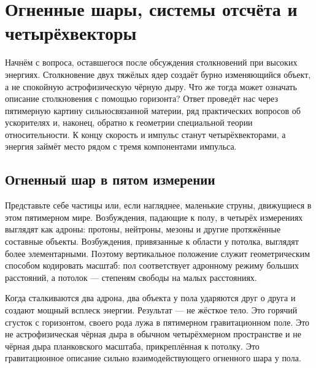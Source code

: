\chapter{Огненные шары, системы отсчёта и четырёхвекторы}

Начнём с вопроса, оставшегося после обсуждения столкновений при высоких энергиях. Столкновение двух тяжёлых ядер создаёт бурно изменяющийся объект, а не спокойную астрофизическую чёрную дыру. Что же тогда может означать описание столкновения с помощью горизонта? Ответ проведёт нас через пятимерную картину сильносвязанной материи, ряд практических вопросов об ускорителях и, наконец, обратно к геометрии специальной теории относительности. К концу скорость и импульс станут четырёхвекторами, а энергия займёт место рядом с тремя компонентами импульса.

\section{Огненный шар в пятом измерении}

\begin{classroomqa}
\end{classroomqa}

Представьте себе частицы или, если нагляднее, маленькие струны, движущиеся в этом пятимерном мире. Возбуждения, падающие к полу, в четырёх измерениях выглядят как адроны: протоны, нейтроны, мезоны и другие протяжённые составные объекты. Возбуждения, привязанные к области у потолка, выглядят более элементарными. Поэтому вертикальное положение служит геометрическим способом кодировать масштаб: пол соответствует адронному режиму больших расстояний, а потолок — степеням свободы на малых расстояниях.

Когда сталкиваются два адрона, два объекта у пола ударяются друг о друга и создают мощный всплеск энергии. Результат — не жёсткое тело. Это горячий сгусток с горизонтом, своего рода лужа в пятимерном гравитационном поле. Это не астрофизическая чёрная дыра в обычном четырёхмерном пространстве и не чёрная дыра планковского масштаба, прикреплённая к потолку. Это гравитационное описание сильно взаимодействующего огненного шара у пола.


